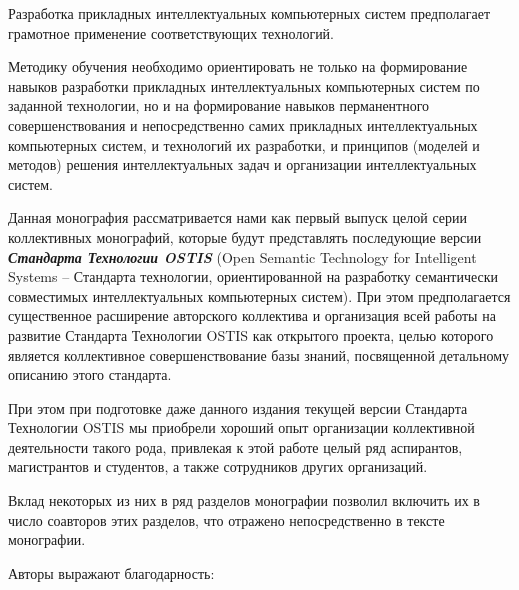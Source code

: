 \begin{SCn}
{	Разработка прикладных интеллектуальных компьютерных систем  предполагает грамотное применение соответствующих технологий.
	
	
	Методику обучения необходимо ориентировать не только на формирование навыков разработки прикладных интеллектуальных компьютерных систем по заданной технологии, но и на формирование навыков перманентного совершенствования  и непосредственно самих прикладных интеллектуальных компьютерных систем, и технологий их разработки, и принципов (моделей и методов) решения интеллектуальных задач и организации интеллектуальных систем.


Данная монография рассматривается нами как первый выпуск целой серии коллективных монографий, которые будут представлять последующие версии \textbf{\textit{Стандарта Технологии OSTIS}} (Open Semantic Technology for Intelligent Systems -- Стандарта технологии, ориентированной на разработку семантически совместимых интеллектуальных компьютерных систем). При этом предполагается существенное расширение авторского коллектива и организация всей работы на развитие Стандарта Технологии OSTIS как открытого проекта, целью которого является коллективное совершенствование базы знаний, посвященной детальному описанию этого стандарта.

При этом при подготовке даже данного издания текущей версии Стандарта Технологии OSTIS мы приобрели хороший опыт организации коллективной деятельности такого рода, привлекая к этой работе целый ряд аспирантов, магистрантов и студентов, а также сотрудников других организаций.

Вклад некоторых из них в ряд разделов монографии позволил включить их в число соавторов этих разделов, что отражено непосредственно в тексте монографии.

Авторы выражают благодарность:

}
\end{SCn}
